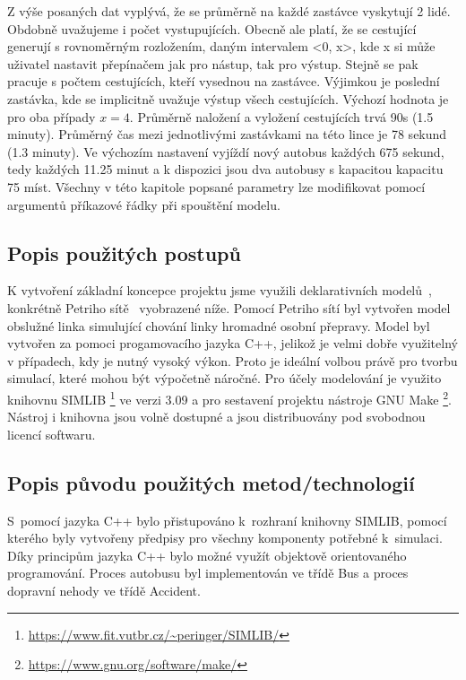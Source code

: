 \documentclass[a4paper]{article}
\begin{document}
 		Z výše posaných dat vyplývá, že se průměrně na každé zastávce vyskytují 2 lidé. Obdobně uvažujeme i počet vystupujících. Obecně ale platí, že se cestující generují s rovnoměrným rozložením, daným intervalem <0, x>, kde x si může uživatel nastavit přepínačem jak pro nástup, tak pro výstup. Stejně se pak pracuje s počtem cestujících, kteří vysednou na zastávce. Výjimkou je poslední zastávka, kde se implicitně uvažuje výstup všech cestujících. Výchozí hodnota je pro oba případy $x = 4$.
 		Průměrně naložení a vyložení cestujících trvá 90s (1.5 minuty). Průměrný čas mezi jednotlivými zastávkami na této lince je 78 sekund (1.3 minuty). 
 		Ve výchozím nastavení vyjíždí nový autobus každých 675 sekund, tedy každých 11.25 minut a k dispozici jsou dva autobusy s kapacitou kapacitu 75 míst. Všechny v této kapitole popsané parametry lze modifikovat pomocí argumentů příkazové řádky při spouštění modelu.
     
        \subsection{Popis použitých postupů}
        \label{subsec:methods}

            K vytvoření základní koncepce projektu jsme využili deklarativních modelů~\cite[snímek 49]{IMS_slides}, konkrétně Petriho sítě~\cite[snímek 123]{IMS_slides} vyobrazené níže.
            Pomocí Petriho sítí byl vytvořen model obslužné linka simulující chování linky hromadné osobní přepravy. Model byl vytvořen za pomoci progamovacího jazyka C++, jelikož je velmi dobře využitelný v případech, kdy je nutný vysoký výkon. Proto je ideální volbou právě pro tvorbu simulací, které mohou být výpočetně náročné. Pro účely modelování je využito knihovnu SIMLIB \footnote{\url{https://www.fit.vutbr.cz/~peringer/SIMLIB/}} ve verzi 3.09 a pro sestavení projektu nástroje GNU Make \footnote{\url{https://www.gnu.org/software/make/}}. Nástroj i knihovna jsou volně dostupné a jsou distribuovány pod svobodnou licencí softwaru.
            
        \subsection{Popis původu použitých metod/technologií}
        \label{subsec:techology}

			S~pomocí jazyka C++ bylo přistupováno k~rozhraní knihovny SIMLIB, pomocí kterého byly vytvořeny předpisy pro všechny komponenty potřebné k~simulaci. Díky principům jazyka C++ bylo možné využít objektově orientovaného programování. Proces autobusu byl implementován ve třídě Bus a proces dopravní nehody ve třídě Accident.
\end{document}
